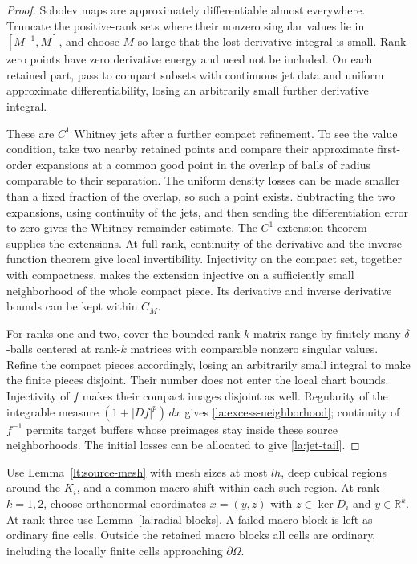 \documentclass[11pt]{article}
\numberwithin{equation}{section}
\theoremstyle{definition}
\theoremstyle{remark}
\newcommand{\R}{\mathbb R}
\begin{document}
\begin{proof}
Sobolev maps are approximately differentiable almost everywhere.
Truncate the positive-rank sets where their nonzero singular values
lie in $[M^{-1},M]$, and choose $M$ so large that the lost derivative
integral is small.  Rank-zero points have zero derivative energy and
need not be included.  On each retained part, pass to compact subsets
with continuous jet data and uniform approximate differentiability,
losing an arbitrarily small further derivative integral.

These are $C^1$ Whitney jets after a further compact refinement.  To
see the value condition, take two nearby retained points and compare
their approximate first-order expansions at a common good point in
the overlap of balls of radius comparable to their separation.  The
uniform density losses can be made smaller than a fixed fraction of
the overlap, so such a point exists.  Subtracting the two expansions,
using continuity of the jets, and then sending the differentiation
error to zero gives the Whitney remainder estimate.  The $C^1$
extension theorem~\cite[Part~I, Section~4, Theorem~I]{Whitney1934} supplies the extensions.  At full rank, continuity
of the derivative and the inverse function theorem give local
invertibility.  Injectivity on the compact set, together with
compactness, makes the extension injective on a sufficiently small
neighborhood of the whole compact piece.  Its derivative and inverse
derivative bounds can be kept within $C_M$.

For ranks one and two, cover the bounded rank-$k$ matrix range by
finitely many $\delta$-balls centered at rank-$k$ matrices with
comparable nonzero singular values.  Refine the compact pieces
accordingly, losing an arbitrarily small integral to make the finite
pieces disjoint.  Their number does not enter the local chart
bounds.  Injectivity of $f$ makes their compact images disjoint as
well.  Regularity of the integrable measure $(1+|Df|^p)\,dx$ gives
\eqref{la:excess-neighborhood}; continuity of $f^{-1}$ permits target
buffers whose preimages stay inside these source neighborhoods.
The initial losses can be allocated to give
\eqref{la:jet-tail}.
\end{proof}

Use Lemma~\ref{lt:source-mesh} with mesh sizes at most $lh$, deep
cubical regions around the $K_i$, and a common macro shift within
each such region.  At rank $k=1,2$, choose orthonormal coordinates
$x=(y,z)$ with $z\in\ker D_i$ and $y\in\R^k$.  At rank three use
Lemma~\ref{la:radial-blocks}.  A failed macro block is left as ordinary
fine cells.  Outside the retained macro blocks all cells are ordinary,
including the locally finite cells approaching $\partial\Omega$.
\end{document}
